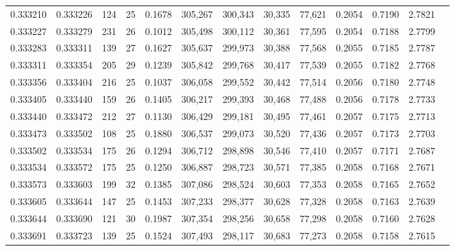 \begin{tabular}{rrrrrrrrrrrrr}
0.333210 & 0.333226 &   124 &  25 &                                     0.1678 & 305,267 & 300,343 &  30,335 &  77,621 & 0.2054 & 0.7190 & 2.7821 \\
0.333227 & 0.333279 &   231 &  26 &                                     0.1012 & 305,498 & 300,112 &  30,361 &  77,595 & 0.2054 & 0.7188 & 2.7799 \\
0.333283 & 0.333311 &   139 &  27 &                                     0.1627 & 305,637 & 299,973 &  30,388 &  77,568 & 0.2055 & 0.7185 & 2.7787 \\
0.333311 & 0.333354 &   205 &  29 &                                     0.1239 & 305,842 & 299,768 &  30,417 &  77,539 & 0.2055 & 0.7182 & 2.7768 \\
0.333356 & 0.333404 &   216 &  25 &                                     0.1037 & 306,058 & 299,552 &  30,442 &  77,514 & 0.2056 & 0.7180 & 2.7748 \\
0.333405 & 0.333440 &   159 &  26 &                                     0.1405 & 306,217 & 299,393 &  30,468 &  77,488 & 0.2056 & 0.7178 & 2.7733 \\
0.333440 & 0.333472 &   212 &  27 &                                     0.1130 & 306,429 & 299,181 &  30,495 &  77,461 & 0.2057 & 0.7175 & 2.7713 \\
0.333473 & 0.333502 &   108 &  25 &                                     0.1880 & 306,537 & 299,073 &  30,520 &  77,436 & 0.2057 & 0.7173 & 2.7703 \\
0.333502 & 0.333534 &   175 &  26 &                                     0.1294 & 306,712 & 298,898 &  30,546 &  77,410 & 0.2057 & 0.7171 & 2.7687 \\
0.333534 & 0.333572 &   175 &  25 &                                     0.1250 & 306,887 & 298,723 &  30,571 &  77,385 & 0.2058 & 0.7168 & 2.7671 \\
0.333573 & 0.333603 &   199 &  32 &                                     0.1385 & 307,086 & 298,524 &  30,603 &  77,353 & 0.2058 & 0.7165 & 2.7652 \\
0.333605 & 0.333644 &   147 &  25 &                                     0.1453 & 307,233 & 298,377 &  30,628 &  77,328 & 0.2058 & 0.7163 & 2.7639 \\
0.333644 & 0.333690 &   121 &  30 &                                     0.1987 & 307,354 & 298,256 &  30,658 &  77,298 & 0.2058 & 0.7160 & 2.7628 \\
0.333691 & 0.333723 &   139 &  25 &                                     0.1524 & 307,493 & 298,117 &  30,683 &  77,273 & 0.2058 & 0.7158 & 2.7615 \\

\end{tabular}
